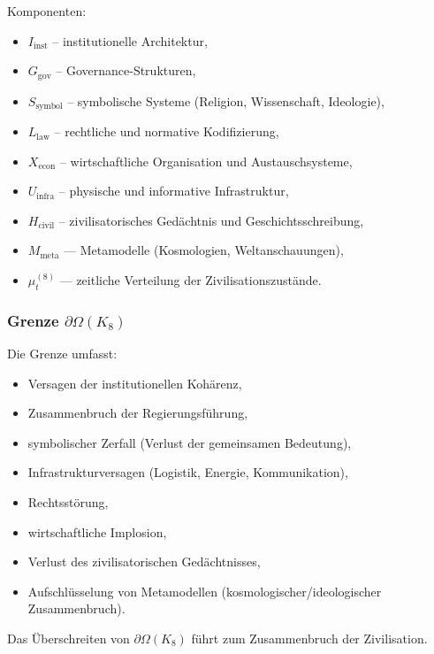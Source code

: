 Komponenten:
\begin{itemize}
    \item $I_{\mathrm{inst}}$ – institutionelle Architektur,
    \item $G_{\mathrm{gov}}$ – Governance-Strukturen,
    \item $S_{\mathrm{symbol}}$ – symbolische Systeme (Religion, Wissenschaft, Ideologie),
    \item $L_{\mathrm{law}}$ – rechtliche und normative Kodifizierung,
    \item $X_{\mathrm{econ}}$ – wirtschaftliche Organisation und Austauschsysteme,
    \item $U_{\mathrm{infra}}$ – physische und informative Infrastruktur,
    \item $H_{\mathrm{civil}}$ – zivilisatorisches Gedächtnis und Geschichtsschreibung,
    \item $M_{\mathrm{meta}}$ — Metamodelle (Kosmologien, Weltanschauungen),
    \item $\mu^{(8)}_t$ — zeitliche Verteilung der Zivilisationszustände.
\end{itemize}

\subsubsection{Grenze \texorpdfstring{$\partial\Omega(K_8)$}{\partial\Omega(K_8)}}

Die Grenze umfasst:
\begin{itemize}
    \item Versagen der institutionellen Kohärenz,
    \item Zusammenbruch der Regierungsführung,
    \item symbolischer Zerfall (Verlust der gemeinsamen Bedeutung),
    \item Infrastrukturversagen (Logistik, Energie, Kommunikation),
    \item Rechtsstörung,
    \item wirtschaftliche Implosion,
    \item Verlust des zivilisatorischen Gedächtnisses,
    \item Aufschlüsselung von Metamodellen (kosmologischer/ideologischer Zusammenbruch).
\end{itemize}

Das Überschreiten von $\partial\Omega(K_8)$ führt zum Zusammenbruch der Zivilisation.

